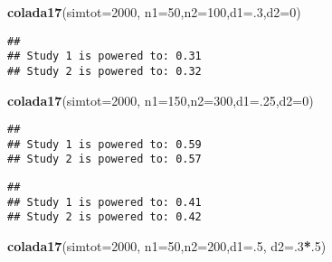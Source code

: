 \documentclass[]{article}
\newenvironment{Shaded}{\begin{snugshade}}{\end{snugshade}}
\newcommand{\KeywordTok}[1]{\textcolor[rgb]{0.13,0.29,0.53}{\textbf{#1}}}
\newcommand{\DataTypeTok}[1]{\textcolor[rgb]{0.13,0.29,0.53}{#1}}
\newcommand{\DecValTok}[1]{\textcolor[rgb]{0.00,0.00,0.81}{#1}}
\newcommand{\CommentTok}[1]{\textcolor[rgb]{0.56,0.35,0.01}{\textit{#1}}}
\newcommand{\OperatorTok}[1]{\textcolor[rgb]{0.81,0.36,0.00}{\textbf{#1}}}
\newcommand{\NormalTok}[1]{#1}
\begin{document}
\begin{Shaded}
\begin{Highlighting}[]
  \KeywordTok{colada17}\NormalTok{(}\DataTypeTok{simtot=}\DecValTok{2000}\NormalTok{, }\DataTypeTok{n1=}\DecValTok{50}\NormalTok{,}\DataTypeTok{n2=}\DecValTok{100}\NormalTok{,}\DataTypeTok{d1=}\NormalTok{.}\DecValTok{3}\NormalTok{,}\DataTypeTok{d2=}\DecValTok{0}\NormalTok{)}
\end{Highlighting}
\end{Shaded}

\begin{verbatim}
## 
## Study 1 is powered to: 0.31
## Study 2 is powered to: 0.32
\end{verbatim}

\begin{Shaded}
\begin{Highlighting}[]
  \KeywordTok{colada17}\NormalTok{(}\DataTypeTok{simtot=}\DecValTok{2000}\NormalTok{, }\DataTypeTok{n1=}\DecValTok{150}\NormalTok{,}\DataTypeTok{n2=}\DecValTok{300}\NormalTok{,}\DataTypeTok{d1=}\NormalTok{.}\DecValTok{25}\NormalTok{,}\DataTypeTok{d2=}\DecValTok{0}\NormalTok{)}
\end{Highlighting}
\end{Shaded}

\begin{verbatim}
## 
## Study 1 is powered to: 0.59
## Study 2 is powered to: 0.57
\end{verbatim}

\begin{Shaded}
\end{Shaded}

\begin{verbatim}
## 
## Study 1 is powered to: 0.41
## Study 2 is powered to: 0.42
\end{verbatim}

\begin{Shaded}
\begin{Highlighting}[]
  \KeywordTok{colada17}\NormalTok{(}\DataTypeTok{simtot=}\DecValTok{2000}\NormalTok{, }\DataTypeTok{n1=}\DecValTok{50}\NormalTok{,}\DataTypeTok{n2=}\DecValTok{200}\NormalTok{,}\DataTypeTok{d1=}\NormalTok{.}\DecValTok{5}\NormalTok{, }\DataTypeTok{d2=}\NormalTok{.}\DecValTok{3}\OperatorTok{*}\NormalTok{.}\DecValTok{5}\NormalTok{)}
\end{Highlighting}
\end{Shaded}
\end{document}
